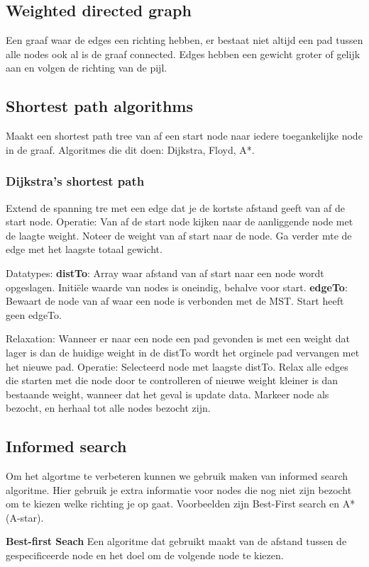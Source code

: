 \subsection{Weighted directed graph}
Een graaf waar de edges een richting hebben, er bestaat niet altijd een pad tussen alle nodes ook al is de graaf connected.
Edges hebben een gewicht groter of gelijk aan en volgen de richting van de pijl.

\subsection{Shortest path algorithms}
Maakt een shortest path tree van af een start node naar iedere toegankelijke node in de graaf.
Algoritmes die dit doen: Dijkstra, Floyd, A*.

\subsubsection{Dijkstra's shortest path}
Extend de spanning tre met een edge dat je de kortste afstand geeft van af de start node.
Operatie:
Van af de start node kijken naar de aanliggende node met de laagte weight.
Noteer de weight van af start naar de node.
Ga verder mte de edge met het laagste totaal gewicht.

Datatypes: 
\textbf{distTo}: Array waar afstand van af start naar een node wordt opgeslagen.
Initiële waarde van nodes is oneindig, behalve voor start.
\textbf{edgeTo}: Bewaart de node van af waar een node is verbonden met de MST.
Start heeft geen edgeTo.

Relaxation:
Wanneer er naar een node een pad gevonden is met een weight dat lager is dan de huidige weight in de distTo wordt het orginele pad vervangen met het nieuwe pad.
Operatie:
Selecteerd node met laagste distTo.
Relax alle edges die starten met die node door te controlleren of nieuwe weight kleiner is dan bestaande weight, wanneer dat het geval is update data.
Markeer node als bezocht, en herhaal tot alle nodes bezocht zijn.

\subsection{Informed search}
Om het algortme te verbeteren kunnen we gebruik maken van informed search algoritme.
Hier gebruik je extra informatie voor nodes die nog niet zijn bezocht om te kiezen welke richting je op gaat.
Voorbeelden zijn Best-First search en A* (A-star).

\textbf{Best-first Seach} Een algoritme dat gebruikt maakt van de afstand tussen de gespecificeerde node en het doel om de volgende node te kiezen.

